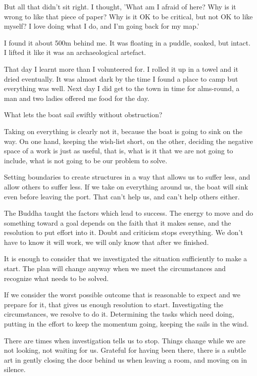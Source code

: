 But all that didn't sit right. I thought, 'What am I afraid of here? Why
is it wrong to like that piece of paper? Why is it OK to be critical,
but not OK to like myself? I love doing what I do, and I'm going back
for my map.'

I found it about 500m behind me. It was floating in a puddle, soaked,
but intact. I lifted it like it was an archaeological artefact.

That day I learnt more than I volunteered for. I rolled it up in a towel
and it dried eventually. It was almost dark by the time I found a place
to camp but everything was well. Next day I did get to the town in time
for alms-round, a man and two ladies offered me food for the day.

What lets the boat sail swiftly without obstruction?

Taking on everything is clearly not it, because the boat is going to
sink on the way. On one hand, keeping the wish-list short, on the other,
deciding the negative space of a work is just as useful, that is, what
is it that we are not going to include, what is not going to be our
problem to solve.

Setting boundaries to create structures in a way that allows us to
suffer less, and allow others to suffer less. If we take on everything
around us, the boat will sink even before leaving the port. That can't
help us, and can't help others either.

The Buddha taught the factors which lead to success. The energy to move
and do something toward a goal depends on the faith that it makes sense,
and the resolution to put effort into it. Doubt and criticism stops
everything. We don't have to know it will work, we will only know that
after we finished.

It is enough to consider that we investigated the situation sufficiently
to make a start. The plan will change anyway when we meet the
circumstances and recognize what needs to be solved.

If we consider the worst possible outcome that is reasonable to expect
and we prepare for it, that gives us enough resolution to start.
Investigating the circumstances, we resolve to do it. Determining the
tasks which need doing, putting in the effort to keep the momentum
going, keeping the sails in the wind.

There are times when investigation tells us to stop. Things change while
we are not looking, not waiting for us. Grateful for having been there,
there is a subtle art in gently closing the door behind us when leaving
a room, and moving on in silence.
